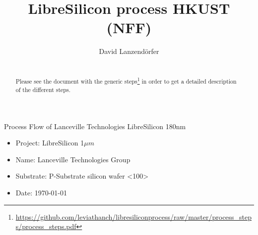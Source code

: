 \documentclass[a4paper,landscape]{article}
\author{David Lanzendörfer}
\title{LibreSilicon process HKUST (NFF)}
\def\micro{\mu m}
\def\um{$\micro$ }
\begin{document}
\maketitle
\begin{abstract}
	 \\
	Please see the document with the generic steps\footnote{\url{https://github.com/leviathanch/libresiliconprocess/raw/master/process_steps/process_steps.pdf}}
	in order to get a detailed description of the different steps.	
\end{abstract}
\vfill
\newpage

Process Flow of Lanceville Technologies LibreSilicon 180nm

\begin{itemize}
	\item Project: LibreSilicon 1\um
	\item Name: Lanceville Technologies Group
	\item Substrate: P-Substrate silicon wafer <100>
	\item Date: \today
\end{itemize}

\begin{mdframed}[linewidth=2pt,linecolor=black]
\begin{center}
	\begin{tikzpicture}[node distance = 3cm, auto, thick,scale=1.0, every node/.style={transform shape}]
		
	\end{tikzpicture}
\end{center}
\end{mdframed}

\end{document}
